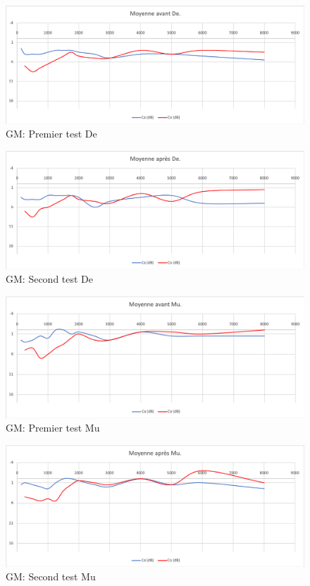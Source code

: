  \begin{figure}[th]
 	\centering
 	\includegraphics[width=0.7\linewidth]{images/graphiques/moyavDE.png}
 	\caption[GM: Patient De : 1° test]{GM: Premier test De}
 	\label{fig:moyavde}
 \end{figure}
 
 
 \begin{figure}[th]
 	\centering
 	\includegraphics[width=0.7\linewidth]{images/graphiques/moyaprDE}
 	\caption[GM: Patient De : 2° test]{GM: Second test De}
 	\label{fig:moyaprde}
 \end{figure}
 
 
 
 
 \begin{figure}[th]
 	\centering
 	\includegraphics[width=0.7\linewidth]{images/graphiques/moyavMU.png}
 	\caption[GM: Patient Mu : 1° test]{GM: Premier test Mu}
 	\label{fig:moyavmu}
 \end{figure}
 
 
 \begin{figure}[th]
 	\centering
 	\includegraphics[width=0.7\linewidth]{images/graphiques/moyaprMU}
 	\caption[GM: Patient Mu : 2° test]{GM: Second test Mu}
 	\label{fig:moyaprmu}
 \end{figure}
 
